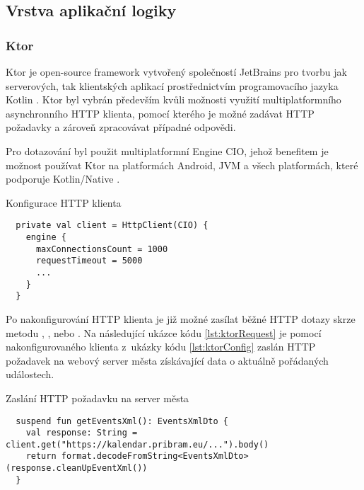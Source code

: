 \subsection{Vrstva aplikační logiky}

\subsubsection*{Ktor}
Ktor je open-source framework vytvořený společností JetBrains pro tvorbu jak serverových, tak klientských aplikací prostřednictvím programovacího 
jazyka Kotlin \cite{ktor}. Ktor byl vybrán především kvůli možnosti využití multiplatformního asynchronního HTTP klienta, pomocí kterého je možné zadávat 
HTTP požadavky a zároveň zpracovávat případné odpovědi. 

Pro dotazování byl použit multiplatformní Engine CIO, jehož benefitem je možnost používat Ktor na platformách Android, JVM a všech platformách, které podporuje Kotlin/Native \cite{ktorCIO}.
\begin{listing}[H]
\caption{Konfigurace HTTP klienta}\label{lst:ktorConfig}
\begin{verbatim}
  private val client = HttpClient(CIO) {
    engine {
      maxConnectionsCount = 1000
      requestTimeout = 5000
      ...
    }
  }
\end{verbatim}
\end{listing}

Po nakonfigurování HTTP klienta je již možné zasílat běžné HTTP dotazy skrze metodu , ,  nebo .
Na následující ukázce kódu \ref{lst:ktorRequest} je pomocí nakonfigurovaného klienta z~ukázky kódu \ref{lst:ktorConfig} zaslán HTTP požadavek
na webový server města získávající data o aktuálně pořádaných událostech.

\begin{listing}[H]
\caption{Zaslání HTTP požadavku na server města}\label{lst:ktorRequest}
\begin{verbatim}
  suspend fun getEventsXml(): EventsXmlDto {
    val response: String = client.get("https://kalendar.pribram.eu/...").body()
    return format.decodeFromString<EventsXmlDto>(response.cleanUpEventXml())
  }
\end{verbatim}
\end{listing}

